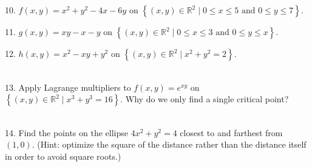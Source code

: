 \documentclass{article}
\begin{document}
10. $f(x, y) = x^2 + y^2 - 4x - 6y$ on $\left\{ (x, y) \in \mathbb{R}^2 \mid 0 \leq x \leq 5 \text{ and } 0 \leq y \leq 7 \right\}$.

11. $g(x, y) = xy - x - y$ on $\left\{ (x, y) \in \mathbb{R}^2 \mid 0 \leq x \leq 3 \text{ and } 0 \leq y \leq x \right\}$.

12. $h(x, y) = x^2 - xy + y^2$ on $\left\{ (x, y) \in \mathbb{R}^2 \mid x^2 + y^2 = 2 \right\}$.

~\\

13. Apply Lagrange multipliers to $f(x, y) = e^{xy}$ on $\left\{ (x, y) \in \mathbb{R}^2 \mid x^3 + y^3 = 16 \right\}$. Why do we only find a single critical point?

~\\

14. Find the points on the ellipse $4x^2 + y^2 = 4$ closest to and farthest from $(1, 0)$. (Hint: optimize the square of the distance rather than the distance itself in order to avoid square roots.)
\end{document}
